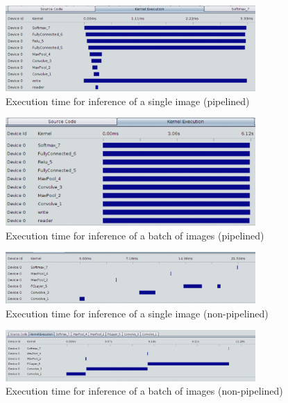 \begin{figure}[h!]
\centering
\includegraphics[width=0.85\textwidth]{Figures/pipesingle}
\decoRule
\caption[pipesingle]{ Execution time for inference of a single image (pipelined)}
\label{fig:pipesingle}
\end{figure}

\begin{figure}[h!]
\centering
\includegraphics[width=0.85\textwidth]{Figures/pipebatch}
\decoRule
\caption[pipebatch]{ Execution time for inference of a batch of images (pipelined)}
\label{fig:pipebatch}
\end{figure}

\begin{figure}[h!]
\centering
\includegraphics[width=0.85\textwidth]{Figures/nonpipesingle}
\decoRule
\caption[nonpipesingle]{ Execution time for inference of a single image (non-pipelined)}
\label{fig:nonpipesingle}
\end{figure}

\begin{figure}[h!]
\centering
\includegraphics[width=0.85\textwidth]{Figures/nonpipebatch}
\decoRule
\caption[nonpipebatch]{ Execution time for inference of a batch of images (non-pipelined)}
\label{fig:nonpipebatch}
\end{figure}

